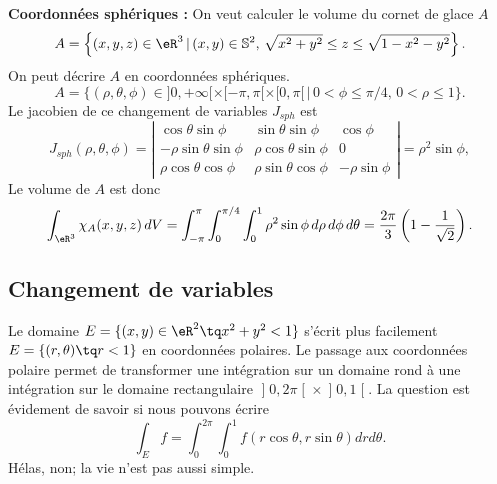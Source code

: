 \begin{example}
\textbf{Coordonnées sphériques : }On veut calculer le volume du cornet de glace  $A$ 
\[
A=\left\{(x,y,z)\in\eR^3\, \vert \, (x,y)\in \mathbb{S}^2, \,\sqrt{x^2+y^2}\leq z\leq \sqrt{1-x^2-y^2} \right\}. 
\]
On peut décrire $A$ en coordonnées sphériques. 
\[
A=\{(\rho,\theta,\phi) \in ]0, +\infty[\times [-\pi,\pi[\times [0,\pi[\,\vert\, 0<\phi\leq\pi/4, \, 0<\rho\leq 1 \}.
\]
Le jacobien de ce changement de variables  $J_{sph}$ est
\begin{equation}
 J_{sph}(\rho, \theta, \phi)= \left\vert\begin{array}{ccc}
\cos \theta \sin\phi & \sin \theta\sin\phi & \cos\phi\\
-\rho\sin \theta\sin\phi  & \rho\cos \theta\sin\phi & 0 \\
\rho\cos\theta\cos\phi&\rho\sin\theta\cos\phi& -\rho\sin\phi
\end{array}\right\vert= \rho^2\sin\phi,
\end{equation}
Le volume de $A$ est donc
\[
\int_{\eR^3}\chi_{A}(x,y,z)\, dV=\int_{-\pi}^{\pi}\int_0^{\pi/4}\int_{0}^{1}\rho^2\sin\phi \,d\rho\,d\phi\,d\theta=\frac{2\pi}{3}\left(1-\frac{1}{\sqrt{2}}\right).  
\] 
\end{example}

					\subsection{Changement de variables}

Le domaine $E=\{ (x,y)\in\eR^2\tq x^2+y^2<1 \}$ s'écrit plus facilement $E=\{ (r,\theta)\tq r<1 \}$ en coordonnées polaires. Le passage aux coordonnées polaire permet de transformer une intégration sur un domaine rond à une intégration sur le domaine rectangulaire $\mathopen]0,2\pi\mathclose[\times\mathopen]0,1\mathclose[$. La question est évidement de savoir si nous pouvons écrire
\begin{equation}
	\int_Ef=\int_{0}^{2\pi}\int_0^1f(r\cos\theta,r\sin\theta)drd\theta.
\end{equation}
Hélas, non; la vie n'est pas aussi simple.

